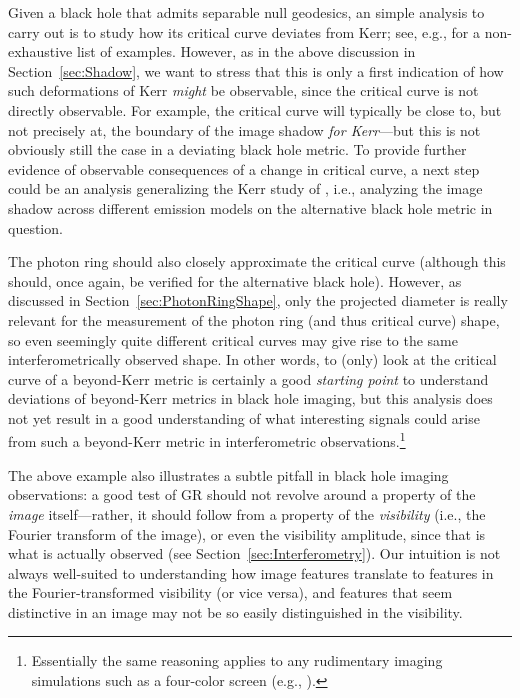 \documentclass[graybox,envcountchap]{svmult}
\begin{document}
Given a black hole that admits separable null geodesics, an simple analysis to carry out is to study how its critical curve deviates from Kerr; see, e.g.,\cite{Johannsen2010,Bambi2010,Abdujabbarov2013,Amarilla2013,Vincent2016,Giddings2018,Mureika2017,Chen2020,Uniyal2023b,Uniyal2023b} for a non-exhaustive list of examples.
However, as in the above discussion in Section~\ref{sec:Shadow}, we want to stress that this is only a first indication of how such deformations of Kerr \emph{might} be observable, since the critical curve is not directly observable.
For example, the critical curve will typically be close to, but not precisely at, the boundary of the image shadow \emph{for Kerr}---but this is not obviously still the case in a deviating black hole metric.
To provide further evidence of observable consequences of a change in critical curve, a next step could be an analysis generalizing the Kerr study of \cite{Bronzwaer2021}, i.e., analyzing the image shadow  across different emission models on the alternative black hole metric in question.

The photon ring should also closely approximate the critical curve (although this should, once again, be verified for the alternative black hole).
However, as discussed in Section~\ref{sec:PhotonRingShape}, only the projected diameter is really relevant for the measurement of the photon ring (and thus critical curve) shape, so even seemingly quite different critical curves may give rise to the same interferometrically observed shape.
In other words, to (only) look at the critical curve of a beyond-Kerr metric is certainly a good \emph{starting point} to understand deviations of beyond-Kerr metrics in black hole imaging, but this analysis does not yet result in a good understanding of what interesting signals could arise from such a beyond-Kerr metric in interferometric observations.\footnote{Essentially the same reasoning applies to any rudimentary imaging simulations such as a four-color screen (e.g., \cite{Cunha2016,Bacchini2021}).}

The above example also illustrates a subtle pitfall in black hole imaging observations: a good test of GR should not revolve around a property of the \emph{image} itself---rather, it should follow from a property of the \emph{visibility} (i.e., the Fourier transform of the image), or even the visibility amplitude, since that is what is actually observed (see Section~\ref{sec:Interferometry}).
Our intuition is not always well-suited to understanding how image features translate to features in the Fourier-transformed visibility (or vice versa), and features that seem distinctive in an image may not be so easily distinguished in the visibility.
\end{document}
